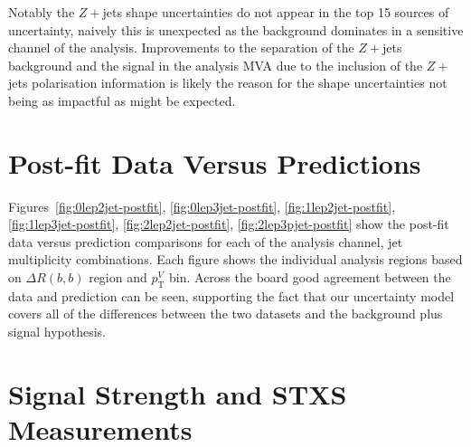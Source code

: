 Notably the $Z+$jets shape uncertainties do not appear in the top 15 sources of
uncertainty, naively this is unexpected as the background dominates in a
sensitive channel of the analysis. Improvements to the separation of the
$Z+$jets background and the signal in the analysis MVA due to the inclusion of
the $Z+$jets polarisation information is likely the reason for the shape
uncertainties not being as impactful as might be expected. 
\clearpage

\section{Post-fit Data Versus Predictions}
Figures~\ref{fig:0lep2jet-postfit}, \ref{fig:0lep3jet-postfit},
\ref{fig:1lep2jet-postfit}, \ref{fig:1lep3jet-postfit},
\ref{fig:2lep2jet-postfit}, \ref{fig:2lep3pjet-postfit} show the post-fit data
versus prediction comparisons for each of the analysis channel, jet multiplicity
combinations. Each figure shows the individual analysis regions based on
$\Delta R(b, b)$ region and $p_{\mathrm{T}}^V$ bin. Across the board good
agreement between the data and prediction can be seen, supporting the fact that
our uncertainty model covers all of the differences between the two datasets and
the background plus signal hypothesis.







\clearpage

\section{Signal Strength and STXS Measurements}

% 

